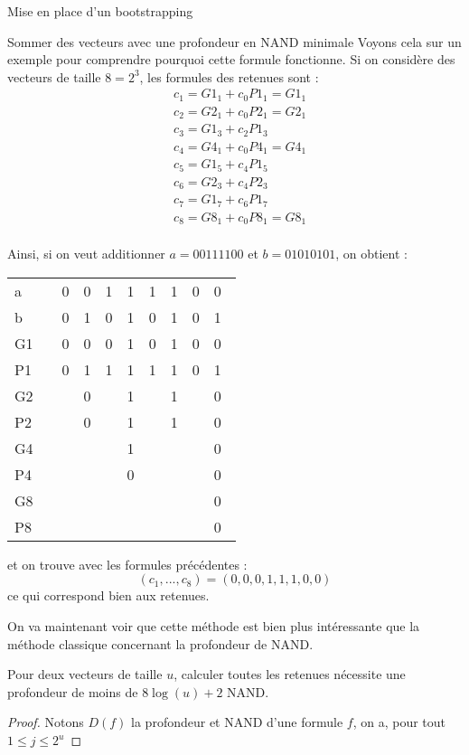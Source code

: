 \begin{section}{Mise en place d'un bootstrapping}
\begin{subsection}{Sommer des vecteurs avec une profondeur en NAND minimale}
	Voyons cela sur un exemple pour comprendre pourquoi cette formule fonctionne. Si on considère des vecteurs de taille $8 = 2^3$, les formules des retenues sont :
\begin{align*}
&c_1 = {G1_1} + c_0 {P1_1} = {G1_1} \\
&c_2 = {G2_1} + c_0 {P2_1} = {G2_1}  \\
&c_3 = {G1_3} + c_2 {P1_3}\\
&c_4 = {G4_1} + c_0 {P4_1} = {G4_1} \\
&c_5 = {G1_5} + c_4 {P1_5}\\
&c_6 = {G2_3} + c_4 {P2_3} \\
&c_7 = {G1_7} + c_6 {P1_7} \\
&c_8 = {G8_1} + c_0 {P8_1} = {G8_1} \\
\end{align*}

	Ainsi, si on veut additionner $a = 00111100$ et $b = 01010101$, on obtient :
\begin{center}
\begin{tabular}{llllllllll}
a  && 0&0&1&1&1&1&0&0 \\
b  && 0&1&0&1&0&1&0&1 \\
G1 && 0&0&0&1&0&1&0&0 \\
P1 && 0&1&1&1&1&1&0&1 \\
G2 && &0&&1&&1&&0 \\
P2 && &0&&1&&1&&0 \\
G4 && &&&1&&&&0 \\
P4 && &&&0&&&&0 \\
G8 && &&&&&&&0 \\
P8 && &&&&&&&0 \\
\end{tabular}
\end{center}

	et on trouve avec les formules précédentes :
\[ (c_1, ..., c_8) = (0,0,0,1,1,1,0,0) \]
	ce qui correspond bien aux retenues.

	On va maintenant voir que cette méthode est bien plus intéressante que la méthode classique concernant la profondeur de NAND.
\begin{prop}
	Pour deux vecteurs de taille $u$, calculer toutes les retenues nécessite une profondeur de moins de $8 \log(u) + 2$ NAND.
\end{prop}

\begin{proof}
	Notons $D(f)$ la profondeur et NAND d'une formule $f$, on a, pour tout $1 \leqslant j \leqslant 2^u $


\end{proof}
\end{subsection}
\end{section}

